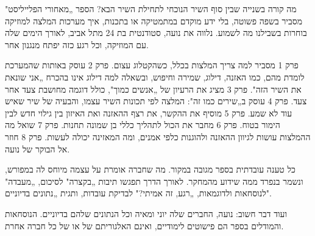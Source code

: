 
מה קורה בשנייה שבין סוף השיר הנוכחי לתחילת השיר הבא? הספר „מאחורי הפלייליסט" מסביר בשפה פשוטה, בלי ידע מוקדם במתמטיקה או בתכנות, איך מערכות המלצה למוזיקה בוחרות בשבילנו מה לשמוע. נלווה את נועה, סטודנטית בת 24 מתל אביב, לאורך הימים שלה עם המוזיקה, וכל רגע כזה יפתח מנגנון אחר.

פרק 1 מסביר למה צריך המלצות בכלל, כשהקטלוג עצום. פרק 2 עוסק באותות שהמערכת לומדת מהם, כמו האזנה, דילוג, שמירה וחיפוש, ובשאלה למה דילוג אינו בהכרח „אני שונאת את השיר הזה". פרק 3 מציג את הרעיון של „אנשים כמוך", כולל דוגמה מחושבת צעד אחר צעד. פרק 4 עוסק ב„שירים כמו זה": המלצה לפי תכונות השיר עצמו, והבעיה של שיר שאיש עוד לא שמע. פרק 5 מוסיף את ההקשר, את רצף ההאזנה ואת האיזון בין גילוי חדש לבין הימור בטוח. פרק 6 מחבר את הכול לתהליך כללי בן שמונה תחנות. פרק 7 שואל מה ההמלצות עושות לגיוון ההאזנה ולהוגנות כלפי אמנים, ומה המאזינה יכולה לעשות. פרק 8 חוזר אל הבוקר של נועה.

כל טענה עובדתית בספר מגובה במקור. מה שחברה אומרת על עצמה מיוחס לה במפורש, ונשמר בנפרד ממה שידוע מהמחקר. לאורך הדרך תפגשו תיבות „בקצרה" לסיכום, „מעבדה" לנוסחאות ולדוגמאות, „רגע, זה אמיתי?" לבדיקת עובדות, ותגית „נתונים בדיוניים".

ועוד דבר חשוב: נועה, החברים שלה יוני ומאיה וכל הנתונים שלהם בדיוניים. הנוסחאות והמודלים בספר הם פישוטים לימודיים, ואינם האלגוריתם של  או של כל חברה אחרת.
